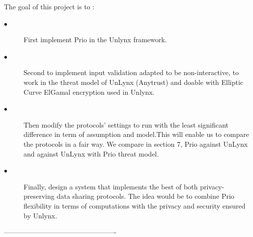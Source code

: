 \documentclass{article}
\begin{document}
The goal of this project is to :
\begin{description}
\item[$\bullet$] First implement Prio in the Unlynx framework.
\item[$\bullet$] Second to implement input validation \cite{range} adapted to be non-interactive, to work in the threat model of UnLynx (Anytrust) and doable with Elliptic Curve ElGamal encryption used in Unlynx.
\item[$\bullet$]{Then modify the protocols' settings to run with the least significant difference in term of assumption and model.This will enable us to compare the protocols in a fair way. We compare in section 7, Prio against UnLynx and against UnLynx with Prio threat model.}
\item[$\bullet$] Finally, design a system that implements the best of both privacy-preserving data sharing protocols. The idea would be to combine Prio flexibility in terms of computations with the privacy and security ensured by Unlynx.\\
\end{description}

-------------------------------------------------

\newpage
\tableofcontents
\newpage


\end{document}
